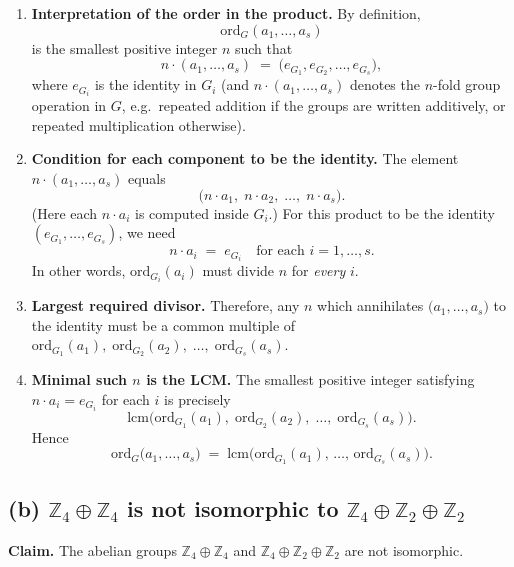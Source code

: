 \documentclass[12pt]{article}
\theoremstyle{definition} %
\theoremstyle{plain} %
\begin{document}
\begin{enumerate}
  \item \textbf{Interpretation of the order in the product.}
  By definition, 
  \[
    \mathrm{ord}_G(a_1, \dots, a_s)
  \]
  is the smallest positive integer $n$ such that 
  \[
    n\cdot(a_1, \dots, a_s) \;=\; \bigl(e_{G_1}, e_{G_2}, \dots, e_{G_s}\bigr),
  \]
  where $e_{G_i}$ is the identity in $G_i$ (and $n\cdot(a_1,\dots,a_s)$ denotes the $n$-fold group operation in $G$, e.g.\ repeated addition if the groups are written additively, or repeated multiplication otherwise).

  \item \textbf{Condition for each component to be the identity.}
  The element $n\cdot(a_1,\dots,a_s)$ equals 
  \[
    \bigl(n\cdot a_1,\; n\cdot a_2,\;\dots,\; n\cdot a_s\bigr).
  \]
  (Here each $n\cdot a_i$ is computed inside $G_i$.)  For this product to be the identity $(e_{G_1},\dots,e_{G_s})$, we need 
  \[
    n\cdot a_i \;=\; e_{G_i} 
    \quad \text{for each } i=1,\dots,s.
  \]
  In other words, $\mathrm{ord}_{G_i}(a_i)$ must divide $n$ for \emph{every} $i$.

  \item \textbf{Largest required divisor.}
  Therefore, any $n$ which annihilates $\bigl(a_1,\dots,a_s)$ to the identity must be a common multiple of 
  $\mathrm{ord}_{G_1}(a_1),\;\mathrm{ord}_{G_2}(a_2),\;\dots,\;\mathrm{ord}_{G_s}(a_s)$.

  \item \textbf{Minimal such $n$ is the LCM.}
  The smallest positive integer satisfying $n \cdot a_i = e_{G_i}$ for each $i$ is precisely
  \[
    \mathrm{lcm}\bigl(\mathrm{ord}_{G_1}(a_1),\;\mathrm{ord}_{G_2}(a_2),\;\dots,\;\mathrm{ord}_{G_s}(a_s)\bigr).
  \]
  Hence
  \[
    \mathrm{ord}_G\bigl(a_1,\dots,a_s\bigr)
    \;=\;
    \mathrm{lcm}\!\bigl(\mathrm{ord}_{G_1}(a_1),\,\dots,\,\mathrm{ord}_{G_s}(a_s)\bigr).
  \]

\end{enumerate}

\bigskip

\subsection*{(b) \(\mathbb{Z}_4 \oplus \mathbb{Z}_4\) is not isomorphic to \(\mathbb{Z}_4 \oplus \mathbb{Z}_2 \oplus \mathbb{Z}_2\)}

\textbf{Claim.} The abelian groups $\mathbb{Z}_4 \oplus \mathbb{Z}_4$ and $\mathbb{Z}_4 \oplus \mathbb{Z}_2 \oplus \mathbb{Z}_2$ are not isomorphic.
\end{document}
